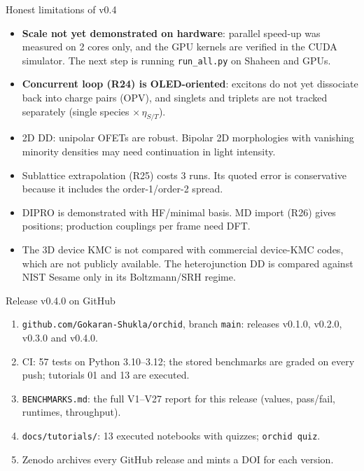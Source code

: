 \documentclass[aspectratio=169,10pt]{beamer}
\begin{document}
\begin{frame}{Honest limitations of v0.4}
\small
\begin{itemize}
\item \textbf{Scale not yet demonstrated on hardware}: parallel speed-up was measured on 2 cores only, and the GPU kernels are verified in the CUDA simulator. The next step is running \texttt{run\_all.py} on Shaheen and GPUs.
\item \textbf{Concurrent loop (R24) is OLED-oriented}: excitons do not yet dissociate back into charge pairs (OPV), and singlets and triplets are not tracked separately (single species $\times\,\eta_{S/T}$).
\item 2D DD: unipolar OFETs are robust. Bipolar 2D morphologies with vanishing minority densities may need continuation in light intensity.
\item Sublattice extrapolation (R25) costs 3 runs. Its quoted error is conservative because it includes the order-1/order-2 spread.
\item DIPRO is demonstrated with HF/minimal basis. MD import (R26) gives positions; production couplings per frame need DFT.
\item The 3D device KMC is not compared with commercial device-KMC codes, which are not publicly available. The heterojunction DD is compared against NIST Sesame only in its Boltzmann/SRH regime.
\end{itemize}
\end{frame}

\begin{frame}{Release v0.4.0 on GitHub}
\small
\begin{enumerate}
\item \texttt{github.com/Gokaran-Shukla/orchid}, branch \texttt{main}: releases v0.1.0, v0.2.0, v0.3.0 and \alert{v0.4.0}.
\item CI: 57 tests on Python 3.10--3.12; the stored benchmarks are graded on every push; tutorials 01 and 13 are executed.
\item \texttt{BENCHMARKS.md}: the full V1--V27 report for this release (values, pass/fail, runtimes, throughput).
\item \texttt{docs/tutorials/}: 13 executed notebooks with quizzes; \texttt{orchid quiz}.
\item Zenodo archives every GitHub release and mints a DOI for each version.
\end{enumerate}
\end{frame}
\end{document}
